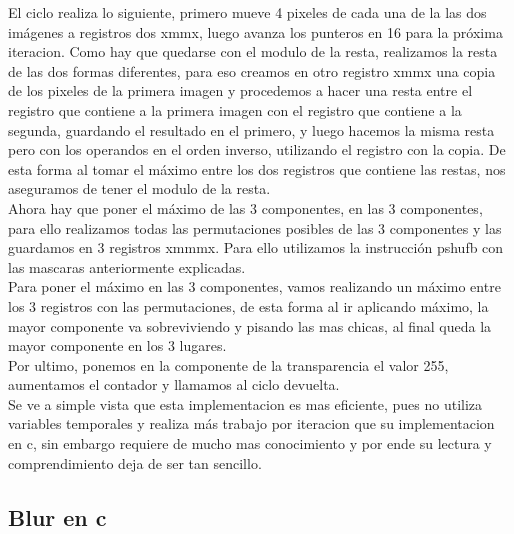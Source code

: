 El ciclo realiza lo siguiente, primero mueve 4 pixeles de cada una de la las dos imágenes a registros dos xmmx, luego avanza los punteros en 16 para la próxima iteracion. Como hay que quedarse con el modulo de la resta, realizamos la resta de las dos formas diferentes, para eso creamos en otro registro xmmx una copia de los pixeles de la primera imagen y procedemos a hacer una resta entre el registro que contiene a la primera imagen con el registro que contiene a la segunda, guardando el resultado en el primero, y luego hacemos la misma resta pero con los operandos en el orden inverso, utilizando el registro con la copia. De esta forma al tomar el máximo entre los dos registros que contiene las restas, nos aseguramos de tener el modulo de la resta. \\

Ahora hay que poner el máximo de las 3 componentes, en las 3 componentes, para ello realizamos todas las permutaciones posibles de las 3 componentes y las guardamos en 3 registros xmmmx. Para ello utilizamos la instrucción pshufb con las mascaras anteriormente explicadas. \\

Para poner el máximo en las 3 componentes, vamos realizando un máximo entre los 3 registros con las permutaciones, de esta forma al ir aplicando máximo, la mayor componente va sobreviviendo y pisando las mas chicas, al final queda la mayor componente en los 3 lugares. \\

Por ultimo, ponemos en la componente de la transparencia el valor 255, aumentamos el contador y llamamos al ciclo devuelta. \\

Se ve a simple vista que esta implementacion es mas eficiente, pues no utiliza variables temporales y realiza más trabajo por iteracion que su implementacion en c, sin embargo requiere de mucho mas conocimiento y por ende su lectura y comprendimiento deja de ser tan sencillo. 

\subsection{Blur en c}

